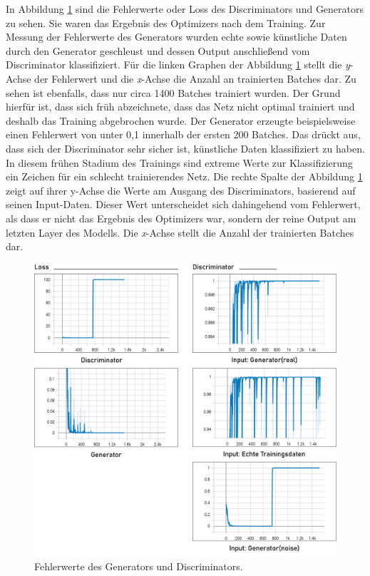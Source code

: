 In Abbildung \ref{tensorboard} sind die Fehlerwerte oder Loss des Discriminators und Generators zu sehen. Sie waren das Ergebnis des Optimizers nach dem Training. Zur Messung der Fehlerwerte des Generators wurden echte sowie künstliche Daten durch den Generator geschleust und dessen Output anschließend vom Discriminator klassifiziert. Für die linken Graphen der Abbildung \ref{tensorboard} stellt die \textit{y}-Achse der Fehlerwert und die \textit{x}-Achse die Anzahl an trainierten Batches dar. Zu sehen ist ebenfalls, dass nur circa 1400 Batches trainiert wurden. Der Grund hierfür ist, dass sich früh abzeichnete, dass das Netz nicht optimal trainiert und deshalb das Training abgebrochen wurde. Der Generator erzeugte beispielsweise einen Fehlerwert von unter 0,1 innerhalb der ersten 200 Batches. Das drückt aus, dass sich der Discriminator sehr sicher ist, künstliche Daten klassifiziert zu haben. In diesem frühen Stadium des Trainings sind extreme Werte zur Klassifizierung ein Zeichen für ein schlecht trainierendes Netz. Die rechte Spalte der Abbildung \ref{tensorboard} zeigt auf ihrer y-Achse die Werte am Ausgang des Discriminators, basierend auf seinen Input-Daten. Dieser Wert unterscheidet sich dahingehend vom Fehlerwert, als dass er nicht das Ergebnis des Optimizers war, sondern der reine Output am letzten Layer des Modells. Die \textit{x}-Achse stellt die Anzahl der trainierten Batches dar. \\

\begin{figure}[ht]
    \centering
    \includegraphics[width=13cm]{bilder/tensorboard2.jpg}
    \caption{Fehlerwerte des Generators und Discriminators.}
    \label{tensorboard}
\end{figure}

